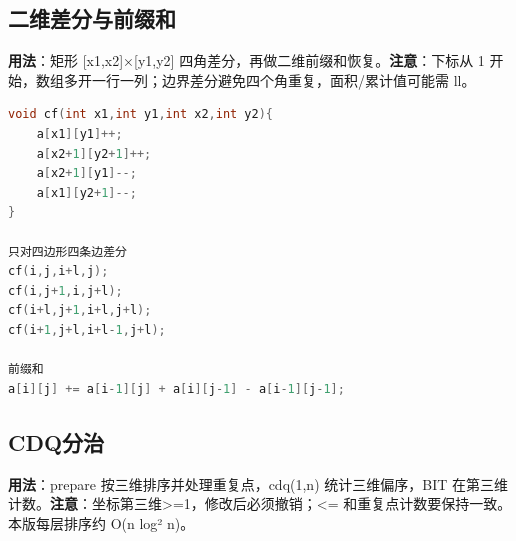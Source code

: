 \documentclass[a4paper,9pt]{extarticle}
\begin{document}
\subsection{二维差分与前缀和}

\textbf{用法}：矩形 [x1,\allowbreak{}x2]×[y1,\allowbreak{}y2] 四角差分，再做二维前缀和恢复。\textbf{注意}：下标从 1 开始，数组多开一行一列；边界差分避免四个角重复，面积/累计值可能需 ll。

\begin{lstlisting}[language={C++}]
void cf(int x1,int y1,int x2,int y2){
    a[x1][y1]++;
    a[x2+1][y2+1]++;
    a[x2+1][y1]--;
    a[x1][y2+1]--;
}

只对四边形四条边差分
cf(i,j,i+l,j);                 
cf(i,j+1,i,j+l);               
cf(i+l,j+1,i+l,j+l);          
cf(i+1,j+l,i+l-1,j+l);   

前缀和
a[i][j] += a[i-1][j] + a[i][j-1] - a[i-1][j-1];

\end{lstlisting}
\subsection{CDQ分治}

\textbf{用法}：prepare 按三维排序并处理重复点，cdq(\allowbreak{}1,\allowbreak{}n) 统计三维偏序，BIT 在第三维计数。\textbf{注意}：坐标第三维>\allowbreak{}=\allowbreak{}1，修改后必须撤销；<\allowbreak{}= 和重复点计数要保持一致。本版每层排序约 O(n log² n)。
\end{document}
